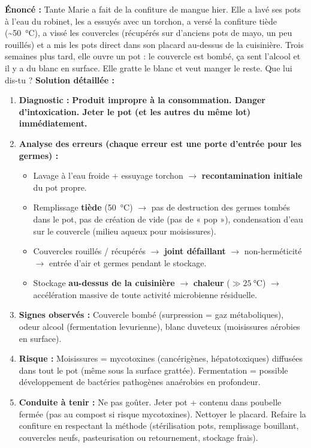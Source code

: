 \documentclass[11pt]{article}
\begin{document}
\begin{exoresolu}
\textbf{Énoncé :} Tante Marie a fait de la confiture de mangue hier. Elle a lavé ses pots à l'eau du robinet, les a essuyés avec un torchon, a versé la confiture tiède (\textasciitilde \SI{50}{\celsius}), a vissé les couvercles (récupérés sur d'anciens pots de mayo, un peu rouillés) et a mis les pots direct dans son placard au-dessus de la cuisinière. Trois semaines plus tard, elle ouvre un pot : le couvercle est bombé, ça sent l'alcool et il y a du blanc en surface. Elle gratte le blanc et veut manger le reste. Que lui dis-tu ?
\tcblower
\textbf{Solution détaillée :}
\begin{enumerate}
    \item \textbf{Diagnostic :} \textbf{Produit impropre à la consommation. Danger d'intoxication. Jeter le pot (et les autres du même lot) immédiatement.}
    \item \textbf{Analyse des erreurs (chaque erreur est une porte d'entrée pour les germes) :}
    \begin{itemize}
        \item Lavage à l'eau froide + essuyage torchon $\rightarrow$ \textbf{recontamination initiale} du pot propre.
        \item Remplissage \textbf{tiède} (\SI{50}{\celsius}) $\rightarrow$ pas de destruction des germes tombés dans le pot, pas de création de vide (pas de « pop »), condensation d'eau sur le couvercle (milieu aqueux pour moisissures).
        \item Couvercles rouillés / récupérés $\rightarrow$ \textbf{joint défaillant} $\rightarrow$ non-herméticité $\rightarrow$ entrée d'air et germes pendant le stockage.
        \item Stockage \textbf{au-dessus de la cuisinière} $\rightarrow$ \textbf{chaleur} ($\gg \SI{25}{\celsius}$) $\rightarrow$ accélération massive de toute activité microbienne résiduelle.
    \end{itemize}
    \item \textbf{Signes observés :} Couvercle bombé (surpression = gaz métaboliques), odeur alcool (fermentation levurienne), blanc duveteux (moisissures aérobies en surface).
    \item \textbf{Risque :} Moisissures = mycotoxines (cancérigènes, hépatotoxiques) diffusées dans tout le pot (même sous la surface grattée). Fermentation = possible développement de bactéries pathogènes anaérobies en profondeur.
    \item \textbf{Conduite à tenir :} Ne pas goûter. Jeter pot + contenu dans poubelle fermée (pas au compost si risque mycotoxines). Nettoyer le placard. Refaire la confiture en respectant la méthode (stérilisation pots, remplissage bouillant, couvercles neufs, pasteurisation ou retournement, stockage frais).
\end{enumerate}
\end{exoresolu}
\end{document}
